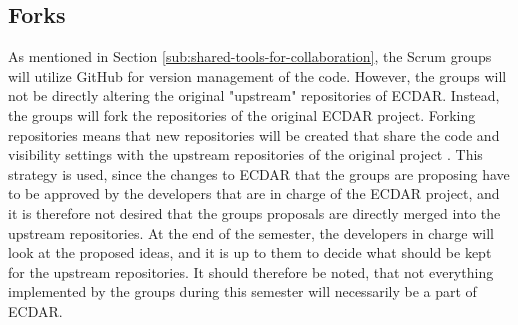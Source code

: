 \subsection{Forks}
As mentioned in Section \ref{sub:shared-tools-for-collaboration}, the Scrum groups will utilize GitHub for version management of the code.
However, the groups will not be directly altering the original "upstream" repositories of ECDAR.
Instead, the groups will fork the repositories of the original ECDAR project. Forking repositories means that new repositories will be created that share the code and visibility settings with the upstream repositories of the original project \cite{github_fork}.
This strategy is used, since the changes to ECDAR that the groups are proposing have to be approved by the developers that are in charge of the ECDAR project, and it is therefore not desired that the groups proposals are directly merged into the upstream repositories.
At the end of the semester, the developers in charge will look at the proposed ideas, and it is up to them to decide what should be kept for the upstream repositories.
It should therefore be noted, that not everything implemented by the groups during this semester will necessarily be a part of ECDAR.  